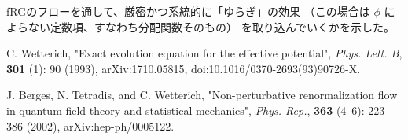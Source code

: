 \documentclass[uplatex,a4j,12pt,dvipdfmx]{jsarticle}
\begin{document}
fRGのフローを通して、厳密かつ系統的に「ゆらぎ」の効果
（この場合は $\phi$ によらない定数項、すなわち分配関数そのもの）
を取り込んでいくかを示した。

\begin{thebibliography}{9}
    C. Wetterich,
    "Exact evolution equation for the effective potential",
    \textit{Phys. Lett. B}, \textbf{301} (1): 90 (1993),
    arXiv:1710.05815,
    doi:10.1016/0370-2693(93)90726-X.
    
    J. Berges, N. Tetradis, and C. Wetterich,
    "Non-perturbative renormalization flow in quantum field theory and statistical mechanics",
    \textit{Phys. Rep.}, \textbf{363} (4–6): 223–386 (2002),
    arXiv:hep-ph/0005122.
    
\end{thebibliography}
\end{document}

